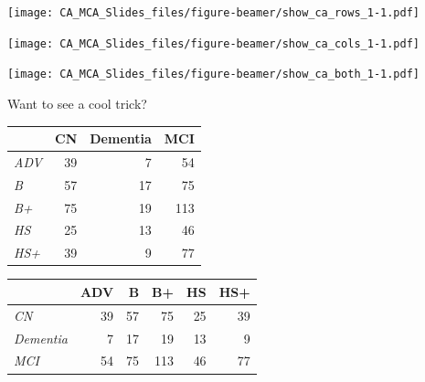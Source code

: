 \documentclass[
  ignorenonframetext,
]{beamer}
\begin{document}
\begin{frame}

\texttt{[image: CA\_MCA\_Slides\_files/figure-beamer/show\_ca\_rows\_1-1.pdf]}

\end{frame}

\begin{frame}

\texttt{[image: CA\_MCA\_Slides\_files/figure-beamer/show\_ca\_cols\_1-1.pdf]}

\end{frame}

\begin{frame}

\texttt{[image: CA\_MCA\_Slides\_files/figure-beamer/show\_ca\_both\_1-1.pdf]}

\end{frame}

\begin{frame}

Want to see a cool trick?

\end{frame}

\begin{frame}

\begin{table}[H]
\centering
\begin{tabular}{>{\em}lrrr}
\toprule
  & CN & Dementia & MCI\\
\midrule
ADV & 39 & 7 & 54\\
B & 57 & 17 & 75\\
B+ & 75 & 19 & 113\\
HS & 25 & 13 & 46\\
HS+ & 39 & 9 & 77\\
\bottomrule
\end{tabular}
\end{table}

\end{frame}

\begin{frame}

\begin{table}[H]
\centering
\begin{tabular}{>{\em}lrrrrr}
\toprule
  & ADV & B & B+ & HS & HS+\\
\midrule
CN & 39 & 57 & 75 & 25 & 39\\
Dementia & 7 & 17 & 19 & 13 & 9\\
MCI & 54 & 75 & 113 & 46 & 77\\
\bottomrule
\end{tabular}
\end{table}

\end{frame}
\end{document}
